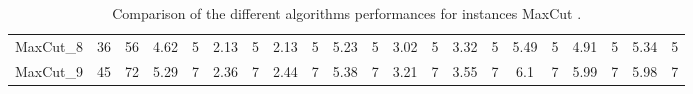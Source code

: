 \begin{sidewaystable}[!ht]
{\begin{tabular}{lcccccccccccccccccccc}
MaxCut\_8 & 36 & 56 & 4.62 & 5 &  \textcolor{blue2}{2.13} & 5 &  \textcolor{blue2}{2.13} & 5 & 5.23 & 5 & 3.02 & 5 & 3.32 & 5 & 5.49 & 5 & 4.91 & 5 & 5.34 & 5 \\
MaxCut\_9 & 45 & 72 & 5.29 & 7 &  \textcolor{blue2}{2.36} & 7 & 2.44 & 7 & 5.38 & 7 & 3.21 & 7 & 3.55 & 7 & 6.1 & 7 & 5.99 & 7 & 5.98 & 7 \\
\bottomrule
\end{tabular}
}%
\caption{Comparison of the different algorithms performances for instances MaxCut .}
\label{tab:table_compare_MaxCut }
\end{sidewaystable}
